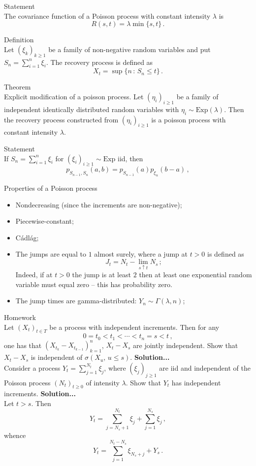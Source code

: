 \noindent Statement\hfill \\
The covariance function of a Poisson process with constant intensity $\lambda$
is
\[ R(s,t) = \lambda\min\{s,t\} \,. \]

\noindent Definition\hfill \\
Let $(\xi_k)_{k\geq1}$ be a family of non-negative random variables and put
$S_n = \sum_{i=1}^n \xi_i$. The recovery process is defined as
\[ X_t = \sup\{n\,:\,S_n \leq t\} \,.\]

\noindent Theorem\hfill \\
Explicit modification of a poisson process. Let $(\eta_i)_{i\geq1}$ be a family
of independent identically distributed random variables with $\eta_i\sim\text{Exp}(\lambda)$.
Then the recovery process constructed from $(\eta_i)_{i\geq1}$ is a poisson process
with constant intensity $\lambda$.

\noindent Statement\hfill \\
If $S_n=\sum_{i=1}^n \xi_i$ for $(\xi_i)_{i\geq1}\sim\text{Exp}$ iid, then
\[ p_{S_{n-1}, S_n}(a,b) = p_{S_{n-1}}(a) p_{\xi_n}(b-a) \,,\] 

\noindent Properties of a Poisson process\hfill \\
\begin{itemize}
	\item Nondecreasing (since the increments are non-negative);
	\item Piecewise-constant;
	\item C\'adl\'ag;
	\item The jumps are equal to $1$ almost surely, where a jump at $t>0$ is
		defined as
		\[ J_t = N_t - \lim_{s\uparrow t} N_s\,; \]
		Indeed, if at $t>0$ the jump is at least $2$ then at least one exponential
		random variable must equal zero -- this has probability zero.
	\item The jump times are gamma-distributed: $Y_n\sim\Gamma(\lambda,n)$;
\end{itemize}

\noindent Homework\hfill\\
Let $(X_t)_{t\in T}$ be a process with independent increments. Then for any
\[ 0 = t_0 < t_1 < \cdots < t_n = s < t\,, \]
one has that $(X_{t_k} - X_{t_{k-1}})_{k=1}^n$, $X_t-X_s$ are jointly independent.
Show that $X_t-X_s$ is independent of $\sigma(X_u,\,u\leq s)$.
\noindent \textbf{Solution...}\hfill\\

Consider a process $Y_t = \sum^{N_t}_{j=1} \xi_j$, where $(\xi_j)_{j\geq 1}$ are
iid and independent of the Poisson process $(N_t)_{t\geq 0}$ of intensity $\lambda$.
Show that $Y_t$ has independent increments.
\noindent \textbf{Solution...}\hfill\\
Let $t>s$. Then
\[ Y_t = \sum^{N_t}_{j=N_s+1} \xi_j + \sum^{N_s}_{j=1}\xi_j \,, \]
whence
\[ Y_t = \sum^{N_t-N_s}_{j=1} \xi_{N_s+j} + Y_s\,. \]





